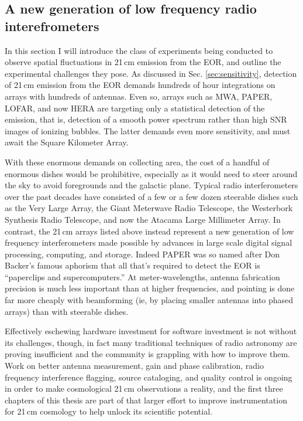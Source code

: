 \subsection{A new generation of low frequency radio interefrometers}

In this section I will introduce the class of experiments being conducted to observe spatial fluctuations in 21\,cm emission from the EOR, and outline the experimental challenges they pose. As discussed in Sec. \ref{sec:sensitivity}, detection of 21\,cm emission from the EOR demands hundreds of hour integrations on arrays with hundreds of antennas. Even so, arrays such as MWA, PAPER, LOFAR, and now HERA are targeting only a statistical detection of the emission, that is, detection of a smooth power spectrum rather than high SNR images of ionizing bubbles. The latter demands even more sensitivity, and must await the Square Kilometer Array.

With these enormous demands on collecting area, the cost of a handful of enormous dishes would be prohibitive, especially as it would need to steer around the sky to avoid foregrounds and the galactic plane. Typical radio interferometers over the past decades have consisted of a few or a few dozen steerable dishes such as the Very Large Array, the Giant Meterwave Radio Telescope, the Westerbork Synthesis Radio Telescope, and now the Atacama Large Millimeter Array. In contrast, the 21\,cm arrays listed above instead represent a new generation of low frequency interferometers made possible by advances in large scale digital signal processing, computing, and storage. Indeed PAPER was so named after Don Backer's famous aphorism that all that's required to detect the EOR is ``paperclips and supercomputers.'' At meter-wavelengths, antenna fabrication precision is much less important than at higher frequencies, and pointing is done far more cheaply with beamforming (ie, by placing smaller antennas into phased arrays) than with steerable dishes. 

Effectively eschewing hardware investment for software investment is not without its challenges, though, in fact many traditional techniques of radio astronomy are proving insufficient and the community is grappling with how to improve them. Work on better antenna measurement, gain and phase calibration, radio frequency interference flagging, source cataloging, and quality control is ongoing in order to make cosmological 21\,cm observations a reality, and the first three chapters of this thesis are part of that larger effort to improve instrumentation for 21\,cm cosmology to help unlock its scientific potential.


